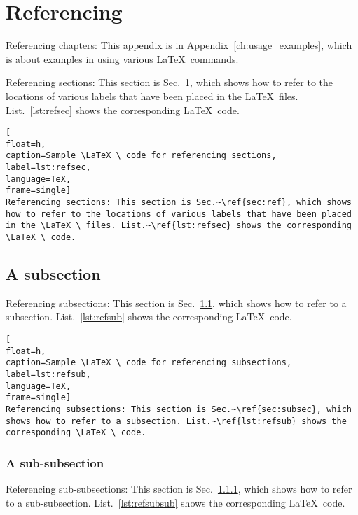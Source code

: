 \newpage
\section{Referencing}
\label{sec:ref}

Referencing chapters: This appendix is in Appendix~\ref{ch:usage_examples}, which is about examples in using various \LaTeX \ commands.

Referencing sections: This section is Sec.~\ref{sec:ref}, which shows how to refer to the locations of various labels that have been placed in the \LaTeX \ files. List.~\ref{lst:refsec} shows the corresponding \LaTeX \ code.

\begin{lstlisting}[
float=h,
caption=Sample \LaTeX \ code for referencing sections, 
label=lst:refsec,
language=TeX,
frame=single]
Referencing sections: This section is Sec.~\ref{sec:ref}, which shows how to refer to the locations of various labels that have been placed in the \LaTeX \ files. List.~\ref{lst:refsec} shows the corresponding \LaTeX \ code.  
\end{lstlisting}
\graytx{\blindtext}
\cleardoublepage






\subsection{A subsection}
\label{sec:subsec}

Referencing subsections: This section is Sec.~\ref{sec:subsec}, which shows how to refer to a subsection. List.~\ref{lst:refsub} shows the corresponding \LaTeX \ code.

\begin{lstlisting}[
float=h,
caption=Sample \LaTeX \ code for referencing subsections, 
label=lst:refsub,
language=TeX,
frame=single]
Referencing subsections: This section is Sec.~\ref{sec:subsec}, which shows how to refer to a subsection. List.~\ref{lst:refsub} shows the corresponding \LaTeX \ code. 
\end{lstlisting}
\graytx{\blindtext}
\cleardoublepage





\subsubsection{A sub-subsection}
\label{sec:subsubsec}


Referencing sub-subsections: This section is Sec.~\ref{sec:subsubsec}, which shows how to refer to a sub-subsection.  List.~\ref{lst:refsubsub} shows the corresponding \LaTeX \ code.

